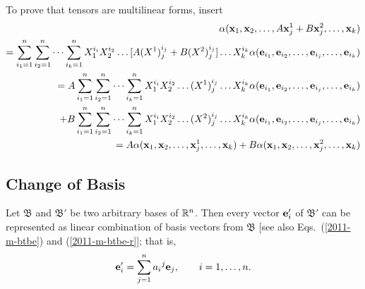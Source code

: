 {\color{OliveGreen}
\bproof
To prove that tensors are multilinear forms, insert
\begin{equation}
\begin{split}
 \alpha ( {\bf x}_1,{\bf x}_2,\ldots , A{\bf x}^1_j+B{\bf x}_j^2,\ldots ,{\bf x}_k)
\\
=
\sum_{i_1=1}^n
\sum_{i_2=1}^n
\cdots
\sum_{i_k=1}^n
X^{i_i}_1X^{i_2}_2\ldots  [A(X^1)^{i_j}_j+B(X^2)^{i_j}_j]\ldots X^{i_k}_k
\alpha ( {\bf e}_{i_1},{\bf e}_{i_2},\ldots,{\bf e}_{i_j},\ldots ,{\bf e}_{i_k})
\\
= A
\sum_{i_1=1}^n
\sum_{i_2=1}^n
\cdots
\sum_{i_k=1}^n
X^{i_i}_1X^{i_2}_2\ldots  (X^1)^{i_j}_j\ldots X^{i_k}_k
\alpha ( {\bf e}_{i_1},{\bf e}_{i_2},\ldots,{\bf e}_{i_j},\ldots ,{\bf e}_{i_k})
\\
\quad +
B
\sum_{i_1=1}^n
\sum_{i_2=1}^n
\cdots
\sum_{i_k=1}^n
X^{i_i}_1X^{i_2}_2\ldots  (X^2)^{i_j}_j\ldots X^{i_k}_k
\alpha ( {\bf e}_{i_1},{\bf e}_{i_2},\ldots,{\bf e}_{i_j},\ldots ,{\bf e}_{i_k})
\\
=
A \alpha ( {\bf x}_1,{\bf x}_2,\ldots , {\bf x}^1_j,\ldots ,{\bf x}_k)+
B \alpha ( {\bf x}_1,{\bf x}_2,\ldots , {\bf x}_j^2,\ldots ,{\bf x}_k)\nonumber
\end{split}
\end{equation}
\eproof
}

\subsection{Change of Basis}
Let
${\mathfrak B}$
and
${\mathfrak B'}$
be two arbitrary bases of
${\Bbb R}^n$.
Then every vector ${\bf e}'_i$ of
${\mathfrak B'}$
can be represented as linear combination of basis vectors from
${\mathfrak B}$ [see also Eqs.~(\ref{2011-m-btbe}) and (\ref{2011-m-btbe-r}]; that is,
\begin{equation}
{\bf e}'_i=\sum_{j=1}^n {a_i}^j {\bf e}_j, \qquad i=1,\ldots , n  .
\label{2001-mu-tensors}
\end{equation}


